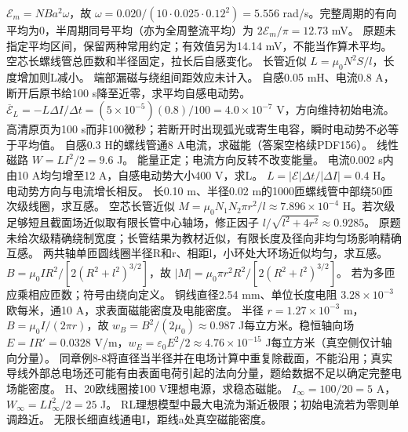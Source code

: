 \workings $\mathcal E_m=NBa^2\omega$，故 $\omega=0.020/(10\cdot0.025\cdot0.12^2)=5.556$ rad/s。完整周期的有向平均为0，半周期同号平均（亦为全周整流平均）为 $2\mathcal E_m/\pi=12.73$ mV。
\crosscheck 原题未指定平均区间，保留两种常用约定；有效值另为14.14 mV，不能当作算术平均。
\problemtext 空芯长螺线管总匝数和半径固定，拉长后自感变化。
\workings 长管近似 $L=\mu_0N^2S/l$，长度增加则L减小。
\crosscheck 端部漏磁与绕组间距效应未计入。
\problemtext 自感0.05 mH、电流0.8 A，断开后原书给100 s降至近零，求平均自感电动势。
\workings $\overline{\mathcal E}_L=-L\Delta I/\Delta t=(5\times10^{-5})(0.8)/100=4.0\times10^{-7}$ V，方向维持初始电流。
\crosscheck 高清原页为100 s而非100微秒；若断开时出现弧光或寄生电容，瞬时电动势不必等于平均值。
\problemtext 自感0.3 H的螺线管通8 A电流，求磁能（答案空格续PDF156）。
\workings 线性磁路 $W=LI^2/2=9.6$ J。
\crosscheck 能量正定；电流方向反转不改变能量。
\problemtext 电流0.002 s内由10 A均匀增至12 A，自感电动势大小400 V，求L。
\workings $L=|\mathcal E|\Delta t/|\Delta I|=0.4$ H。
\crosscheck 电动势方向与电流增长相反。
\problemtext 长0.10 m、半径0.02 m的1000匝螺线管中部绕50匝次级线圈，求互感。
\workings 空芯长管近似 $M=\mu_0N_1N_2\pi r^2/l\approx7.896\times10^{-4}$ H。若次级足够短且截面场近似取有限长管中心轴场，修正因子 $l/\sqrt{l^2+4r^2}\approx0.9285$。
\crosscheck 原题未给次级精确绕制宽度；长管结果为教材近似，有限长度及径向非均匀场影响精确互感。
\problemtext 两共轴单匝圆线圈半径R和r、相距l，小环处大环场近似均匀，求互感。
\workings $B=\mu_0IR^2/[2(R^2+l^2)^{3/2}]$，故 $|M|=\mu_0\pi r^2R^2/[2(R^2+l^2)^{3/2}]$。
\crosscheck 若为多匝应乘相应匝数；符号由绕向定义。
\problemtext 铜线直径2.54 mm、单位长度电阻 $3.28\times10^{-3}$ 欧每米，通10 A，求表面磁能密度及电能密度。
\workings 半径 $r=1.27\times10^{-3}$ m，$B=\mu_0I/(2\pi r)$，故 $w_B=B^2/(2\mu_0)\approx0.987$ J每立方米。稳恒轴向场 $E=IR'=0.0328$ V/m，$w_E=\varepsilon_0 E^2/2\approx4.76\times10^{-15}$ J每立方米（真空侧仅计轴向分量）。
\crosscheck 同章例8-8将直径当半径并在电场计算中重复除截面，不能沿用；真实导线外部总电场还可能有由表面电荷引起的法向分量，题给数据不足以确定完整电场能密度。
 H、20欧线圈接100 V理想电源，求稳态磁能。
\workings $I_\infty=100/20=5$ A，$W_\infty=LI_\infty^2/2=25$ J。
\crosscheck RL理想模型中最大电流为渐近极限；初始电流若为零则单调趋近。
\problemtext 无限长细直线通电I，距线a处真空磁能密度。
